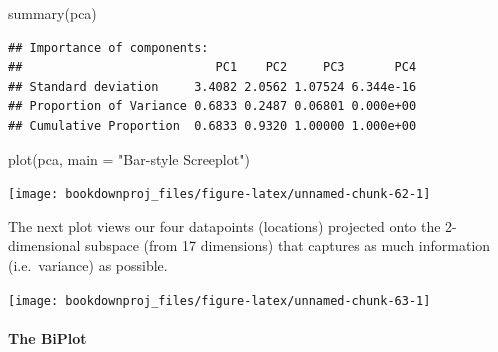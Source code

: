 \documentclass[
]{article}
\newenvironment{Shaded}{\begin{snugshade}}{\end{snugshade}}
\newcommand{\AttributeTok}[1]{\textcolor[rgb]{0.77,0.63,0.00}{#1}}
\newcommand{\DecValTok}[1]{\textcolor[rgb]{0.00,0.00,0.81}{#1}}
\newcommand{\FunctionTok}[1]{\textcolor[rgb]{0.00,0.00,0.00}{#1}}
\newcommand{\NormalTok}[1]{#1}
\newcommand{\SpecialCharTok}[1]{\textcolor[rgb]{0.00,0.00,0.00}{#1}}
\newcommand{\StringTok}[1]{\textcolor[rgb]{0.31,0.60,0.02}{#1}}
\theoremstyle{definition}
\theoremstyle{definition}
\theoremstyle{definition}
\theoremstyle{definition}
\theoremstyle{remark}
\begin{document}
\begin{Shaded}
\begin{Highlighting}[]
\FunctionTok{summary}\NormalTok{(pca)}
\end{Highlighting}
\end{Shaded}

\begin{verbatim}
## Importance of components:
##                           PC1    PC2     PC3       PC4
## Standard deviation     3.4082 2.0562 1.07524 6.344e-16
## Proportion of Variance 0.6833 0.2487 0.06801 0.000e+00
## Cumulative Proportion  0.6833 0.9320 1.00000 1.000e+00
\end{verbatim}

\begin{Shaded}
\begin{Highlighting}[]
\FunctionTok{plot}\NormalTok{(pca, }\AttributeTok{main =} \StringTok{"Bar{-}style Screeplot"}\NormalTok{)}
\end{Highlighting}
\end{Shaded}

\begin{center}\texttt{[image: bookdownproj\_files/figure-latex/unnamed-chunk-62-1]} \end{center}

The next plot views our four datapoints (locations) projected onto the 2-dimensional subspace
(from 17 dimensions) that captures as much information (i.e.~variance) as possible.

\begin{Shaded}
\end{Shaded}

\begin{center}\texttt{[image: bookdownproj\_files/figure-latex/unnamed-chunk-63-1]} \end{center}

\hypertarget{the-biplot-1}{%
\paragraph{The BiPlot}\label{the-biplot-1}}
\end{document}
